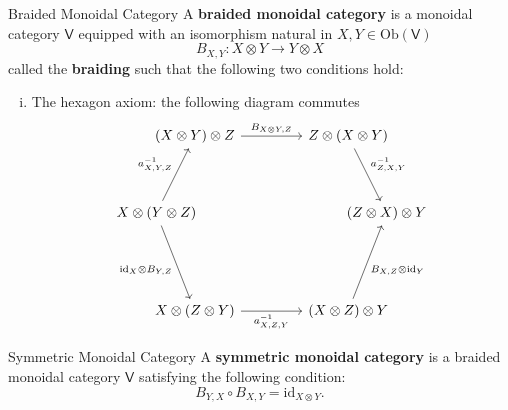 \begin{definition}{Braided Monoidal Category}{}
    A \textbf{braided monoidal category} is a monoidal category $\mathsf{V}$ equipped with an isomorphism natural in $X,Y\in \mathrm{Ob}(\mathsf{V})$
    \[
        B_{X,Y} : X \otimes Y \to Y \otimes X
    \]
    called the \textbf{braiding} such that the following two conditions hold:
    \begin{enumerate}[(i)]
        \item The hexagon axiom: the following diagram commutes
        \[
            \begin{tikzcd}[ampersand replacement=\&, column sep=small]
                \&[-50pt] (X\otimes Y)\otimes Z\arrow[rr, "{B_{X\otimes Y,Z}}"]\&[+45pt]  \&[-25pt] Z\otimes (X\otimes Y) \arrow[rd, "{a_{Z,X,Y}^{-1}}"] \&[-50pt] \\[+20pt]
                X\otimes (Y\otimes Z)\arrow[ru, "{a_{X,Y,Z}^{-1}}"] \arrow[rd, "{\mathrm{id}_X\otimes B_{Y,Z}}"'] \& \& \& \& (Z\otimes X)\otimes Y \\[+35pt]
                \& X\otimes (Z\otimes Y) \arrow[rr, "{a_{X,Z,Y}^{-1}}"'] \& \& (X\otimes Z)\otimes Y\arrow[ru, "{B_{X,Z}\otimes\mathrm{id}_Y}"']  \& 
            \end{tikzcd}
        \]
    \end{enumerate}
\end{definition}


\begin{definition}{Symmetric Monoidal Category}{}
    A \textbf{symmetric monoidal category} is a braided monoidal category $\mathsf{V}$ satisfying the following condition:
    \[
        B_{Y,X}\circ B_{X,Y}=\mathrm{id}_{X\otimes Y}.
    \]
\end{definition}

